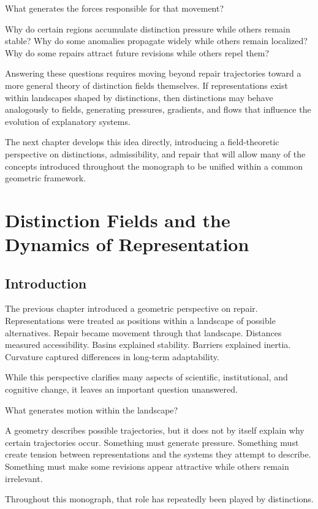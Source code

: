 \documentclass[11pt,oneside,openany]{book}
\begin{document}
What generates the forces responsible for that movement?

Why do certain regions accumulate distinction pressure while others remain stable? Why do some anomalies propagate widely while others remain localized? Why do some repairs attract future revisions while others repel them?

Answering these questions requires moving beyond repair trajectories toward a more general theory of distinction fields themselves. If representations exist within landscapes shaped by distinctions, then distinctions may behave analogously to fields, generating pressures, gradients, and flows that influence the evolution of explanatory systems.

The next chapter develops this idea directly, introducing a field-theoretic perspective on distinctions, admissibility, and repair that will allow many of the concepts introduced throughout the monograph to be unified within a common geometric framework.

\chapter{Distinction Fields and the Dynamics of Representation}

\section{Introduction}

The previous chapter introduced a geometric perspective on repair. Representations were treated as positions within a landscape of possible alternatives. Repair became movement through that landscape. Distances measured accessibility. Basins explained stability. Barriers explained inertia. Curvature captured differences in long-term adaptability.

While this perspective clarifies many aspects of scientific, institutional, and cognitive change, it leaves an important question unanswered.

What generates motion within the landscape?

A geometry describes possible trajectories, but it does not by itself explain why certain trajectories occur. Something must generate pressure. Something must create tension between representations and the systems they attempt to describe. Something must make some revisions appear attractive while others remain irrelevant.

Throughout this monograph, that role has repeatedly been played by distinctions.
\end{document}
